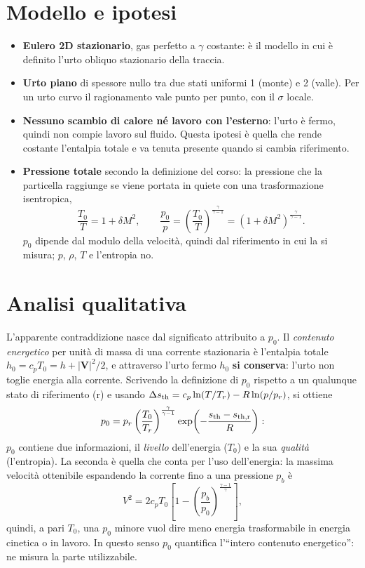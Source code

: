 \documentclass[11pt,a4paper]{article}
\newcommand{\Vv}{\boldsymbol V}
\newcommand{\sth}{s_{\rm th}}
\newcommand{\kk}{\frac{\gamma}{\gamma-1}}
\begin{document}
\section{Modello e ipotesi}
\begin{itemize}
  \item \textbf{Eulero 2D stazionario}, gas perfetto a $\gamma$ costante: è il modello in cui è definito l'urto
    obliquo stazionario della traccia.
  \item \textbf{Urto piano} di spessore nullo tra due stati uniformi 1 (monte) e 2 (valle). Per un urto curvo il
    ragionamento vale punto per punto, con il $\sigma$ locale.
  \item \textbf{Nessuno scambio di calore né lavoro con l'esterno}: l'urto è fermo, quindi non compie lavoro sul
    fluido. Questa ipotesi è quella che rende costante l'entalpia totale e va tenuta presente quando si cambia
    riferimento.
  \item \textbf{Pressione totale} secondo la definizione del corso: la pressione che la particella raggiunge
    se viene portata in quiete con una trasformazione isentropica,
    \[
      \frac{T_0}{T}=1+\delta M^2,\qquad
      \frac{p_0}{p}=\left(\frac{T_0}{T}\right)^{\kk}=\left(1+\delta M^2\right)^{\kk}.
    \]
    $p_0$ dipende dal modulo della velocità, quindi dal riferimento in cui la si misura; $p$, $\rho$, $T$ e
    l'entropia no.
\end{itemize}

\section{Analisi qualitativa}
L'apparente contraddizione nasce dal significato attribuito a $p_0$. Il \emph{contenuto energetico} per unità di
massa di una corrente stazionaria è l'entalpia totale $h_0=c_pT_0=h+|\Vv|^2/2$, e attraverso l'urto fermo
$h_0$ \textbf{si conserva}: l'urto non toglie energia alla corrente. Scrivendo la definizione di $p_0$ rispetto a un
qualunque stato di riferimento (r) e usando
$\Delta\sth=c_p\ln(T/T_r)-R\ln(p/p_r)$, si ottiene
\[
  p_0=p_r\left(\frac{T_0}{T_r}\right)^{\kk}\exp\!\left(-\frac{\sth-s_{\rm th,r}}{R}\right):
\]
$p_0$ contiene due informazioni, il \emph{livello} dell'energia ($T_0$) e la sua \emph{qualità} (l'entropia).
La seconda è quella che conta per l'uso dell'energia: la massima velocità ottenibile espandendo la corrente fino a
una pressione $p_b$ è
\[
  V^2=2c_pT_0\left[1-\left(\frac{p_b}{p_0}\right)^{\frac{\gamma-1}{\gamma}}\right],
\]
quindi, a pari $T_0$, una $p_0$ minore vuol dire meno energia trasformabile in energia cinetica o in lavoro. In
questo senso $p_0$ quantifica l'``intero contenuto energetico'': ne misura la parte utilizzabile.
\end{document}
